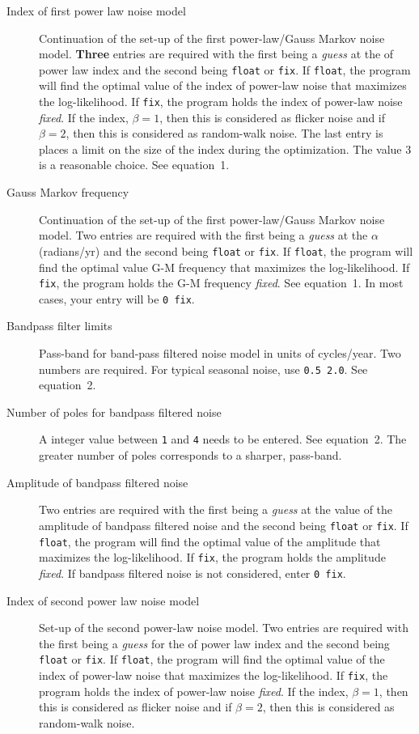 \documentclass[12pt]{amsart}
\begin{document}
\begin{description}
\item[Index of first power law noise model] Continuation of the set-up of the first power-law/Gauss Markov noise model.
\textbf{Three} entries are required
with the first being a \textit{guess} at the of power law index and the second being \texttt{float} or \texttt{fix}.
If \texttt{float}, the program will find the optimal value of the index of power-law noise that maximizes the log-likelihood. If \texttt{fix},
the program holds the index of power-law noise \textit{fixed}.  If the index, $\beta=1$, then this is considered
as flicker noise and if $\beta=2$, then this is considered
as random-walk noise.  The last entry is places a limit on the size of the index during the optimization. The value
$3$ is a reasonable choice. See equation~1.

\item[Gauss Markov frequency] Continuation of the set-up of the first power-law/Gauss Markov noise model.
Two entries are required
with the first being a \textit{guess} at the ${\alpha}$ (radians/yr) and the second being \texttt{float} or \texttt{fix}.
If \texttt{float}, the program will find the optimal value G-M frequency that maximizes the log-likelihood. If \texttt{fix},
the program holds the G-M frequency \textit{fixed}.   See equation~1. In most cases, your entry will be \texttt{0 fix}.

\item[Bandpass filter limits] Pass-band for band-pass filtered noise model in units of cycles/year. Two numbers are
required. For typical seasonal noise, use \texttt{0.5 2.0}.  See equation~2. 

\item[Number of poles for bandpass filtered noise] A integer value between \texttt{1} and \texttt{4} needs to be entered. See equation~2.
The greater number of poles corresponds to
a sharper, pass-band.

\item[Amplitude of bandpass filtered noise] Two entries are required
with the first being a \textit{guess} at the value of the amplitude of bandpass filtered noise and the second being \texttt{float} or \texttt{fix}.
If \texttt{float}, the program will find the optimal value of the amplitude  that maximizes the log-likelihood. If \texttt{fix},
the program holds the amplitude  \textit{fixed}.  If bandpass filtered noise is not considered, enter \texttt{0 fix}.

\item[Index of second power law noise model] Set-up of the second power-law noise model.
Two entries are required
with the first being a \textit{guess} for the of power law index and the second being \texttt{float} or \texttt{fix}.
If \texttt{float}, the program will find the optimal value of the index of power-law noise that maximizes the log-likelihood. If \texttt{fix},
the program holds the index of power-law noise \textit{fixed}.  If the index, $\beta=1$, then this is considered
as flicker noise and if $\beta=2$, then this is considered
as random-walk noise.


\end{description}
\end{document}
